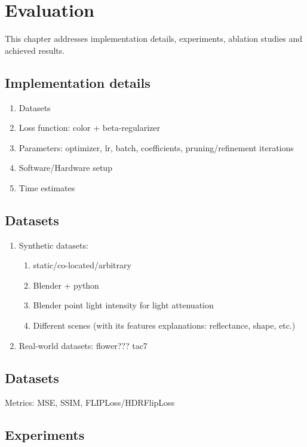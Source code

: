 
\chapter{Evaluation }
\label{chap:evaluation}

This chapter addresses implementation details, experiments, ablation studies and achieved results.


\section{Implementation details}

\begin{enumerate}
    \item Datasets
    \item Loss function: color + beta-regularizer
    \item Parameters: optimizer, lr, batch, coefficients, pruning/refinement iterations
    \item Software/Hardware setup
    \item Time estimates
\end{enumerate}


\section{Datasets}
\begin{enumerate}
    \item Synthetic datasets:
    \begin{enumerate}
        \item static/co-located/arbitrary
        \item Blender + python
        \item Blender point light intensity for light attenuation
        \item Different scenes (with its features explanations: reflectance, shape, etc.)
    \end{enumerate}
    \item Real-world datasets: flower??? tac7
\end{enumerate}


\section{Datasets}

Metrics: MSE, SSIM, FLIPLoss/HDRFlipLoss


\section{Experiments}

